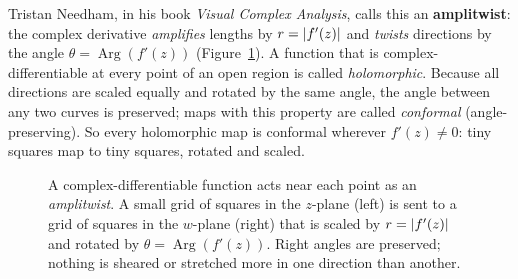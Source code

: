 Tristan Needham, in his book \emph{Visual Complex Analysis}, calls this an \textbf{amplitwist}: the complex derivative \emph{amplifies} lengths by $r = \lvert f'(z)\rvert$ and \emph{twists} directions by the angle $\theta = \operatorname{Arg}(f'(z))$ (Figure~\ref{ch35:fig-amplitwist}). A function that is complex-differentiable at every point of an open region is called \emph{holomorphic}. Because all directions are scaled equally and rotated by the same angle, the angle between any two curves is preserved; maps with this property are called \emph{conformal} (angle-preserving). So every holomorphic map is conformal wherever $f'(z)\neq 0$: tiny squares map to tiny squares, rotated and scaled.

\begin{figure}[htbp]
\centering
{}
\caption{A complex-differentiable function acts near each point as an
\emph{amplitwist}. A small grid of squares in the $z$-plane (left) is sent to a grid
of squares in the $w$-plane (right) that is scaled by $r = \lvert f'(z)\rvert$ and rotated
by $\theta = \operatorname{Arg}(f'(z))$. Right angles are preserved; nothing is
sheared or stretched more in one direction than another.}
\label{ch35:fig-amplitwist}
\end{figure}

